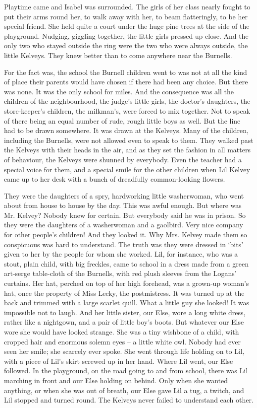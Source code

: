 \documentclass[10pt,a4paper]{article}
\begin{document}
Playtime came and Isabel was surrounded. The girls of her class nearly fought to put their arms round her, to walk away with her, to beam flatteringly, to be her special friend. She held quite a court under the huge pine trees at the side of the playground. Nudging, giggling together, the little girls pressed up close. And the only two who stayed outside the ring were the two who were always outside, the little Kelveys. They knew better than to come anywhere near the Burnells.

For the fact was, the school the Burnell children went to was not at all the kind of place their parents would have chosen if there had been any choice. But there was none. It was the only school for miles. And the consequence was all the children of the neighbourhood, the judge’s little girls, the doctor’s daughters, the store-keeper’s children, the milkman’s, were forced to mix together. Not to speak of there being an equal number of rude, rough little boys as well. But the line had to be drawn somewhere. It was drawn at the Kelveys. Many of the children, including the Burnells, were not allowed even to speak to them. They walked past the Kelveys with their heads in the air, and as they set the fashion in all matters of behaviour, the Kelveys were shunned by everybody. Even the teacher had a special voice for them, and a special smile for the other children when Lil Kelvey came up to her desk with a bunch of dreadfully common-looking flowers.

They were the daughters of a spry, hardworking little washerwoman, who went about from house to house by the day. This was awful enough. But where was Mr. Kelvey? Nobody knew for certain. But everybody said he was in prison. So they were the daughters of a washerwoman and a gaolbird. Very nice company for other people’s children! And they looked it. Why Mrs. Kelvey made them so conspicuous was hard to understand. The truth was they were dressed in ‘bits’ given to her by the people for whom she worked. Lil, for instance, who was a stout, plain child, with big freckles, came to school in a dress made from a green art-serge table-cloth of the Burnells, with red plush sleeves from the Logans’ curtains. Her hat, perched on top of her high forehead, was a grown-up woman’s hat, once the property of Miss Lecky, the postmistress. It was turned up at the back and trimmed with a large scarlet quill. What a little guy she looked! It was impossible not to laugh. And her little sister, our Else, wore a long white dress, rather like a nightgown, and a pair of little boy’s boots. But whatever our Else wore she would have looked strange. She was a tiny wishbone of a child, with cropped hair and enormous solemn eyes – a little white owl. Nobody had ever seen her smile; she scarcely ever spoke. She went through life holding on to Lil, with a piece of Lil’s skirt screwed up in her hand. Where Lil went, our Else followed. In the playground, on the road going to and from school, there was Lil marching in front and our Else holding on behind. Only when she wanted anything, or when she was out of breath, our Else gave Lil a tug, a twitch, and Lil stopped and turned round. The Kelveys never failed to understand each other.
\end{document}
